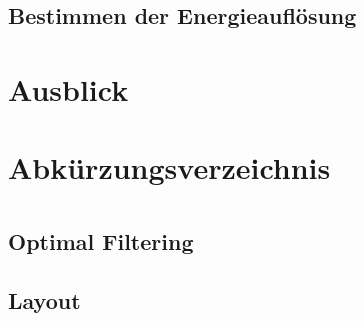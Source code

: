 \documentclass{include/thesisclass}
\begin{document}
    \section{Bestimmen der Energieauflösung}
	
    
    \chapter{Ausblick}
    





    \TheBibliography

    
    \printbibliography {}
	\listoffigures %
	\chapter*{Abkürzungsverzeichnis}
	
    \Appendix
    \chapter{\appendixname} %
    \section{Optimal Filtering}\label{sec:OpFiltering}
    \label{sec:OptFilt}
    \section{Layout}
    
\end{document}
